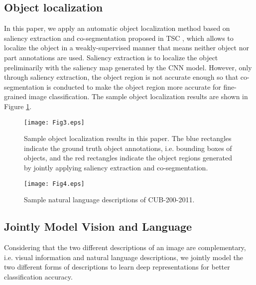 \documentclass[10pt,twocolumn,letterpaper]{article}
\begin{document}
\subsection{Object localization}
In this paper, we apply an automatic object localization method based on saliency extraction and co-segmentation proposed in TSC \cite{spatialconstraints}, which allows to localize the object in a weakly-supervised manner that means neither object nor part annotations are used. Saliency extraction is to localize the object preliminarily with the saliency map generated by the CNN model. However, only through saliency extraction, the object region is not accurate enough so that co-segmentation is conducted to make the object region more accurate for fine-grained image classification. The sample object localization results are shown in Figure \ref{object}.


\begin{figure}[t]
\begin{center}
\texttt{[image: Fig3.eps]}
\end{center}
   \caption{Sample object localization results in this paper. The blue rectangles indicate the ground truth object annotations, i.e. bounding boxes of objects, and the red rectangles indicate the object regions generated by jointly applying saliency extraction and co-segmentation.}
\label{object}
\end{figure}


\begin{figure*}[t]
\begin{center}
\texttt{[image: Fig4.eps]}
\end{center}
   \caption{Sample natural language descriptions of CUB-200-2011.}
\label{language example}
\end{figure*}



\subsection{Jointly Model Vision and Language}
Considering that the two different descriptions of an image are complementary, i.e. visual information and natural language descriptions, we jointly model the two different forms of descriptions to learn deep representations for better classification accuracy.
\end{document}
